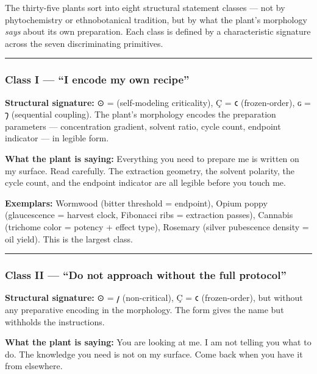 The thirty-five plants sort into eight structural statement classes ---
not by phytochemistry or ethnobotanical tradition, but by what the
plant's morphology \emph{says} about its own preparation. Each class is
defined by a characteristic signature across the seven discriminating
primitives.

\begin{center}\rule{0.5\linewidth}{0.5pt}\end{center}

\hypertarget{class-i-i-encode-my-own-recipe}{%
\subsubsection{Class I --- ``I encode my own
recipe''}\label{class-i-i-encode-my-own-recipe}}

\textbf{Structural signature:} ⊙ = \odot (self-modeling criticality), Ç
= 𐑤 (frozen-order), ɢ = 𐑠 (sequential coupling). The plant's morphology
encodes the preparation parameters --- concentration gradient, solvent
ratio, cycle count, endpoint indicator --- in legible form.

\textbf{What the plant is saying:} Everything you need to prepare me is
written on my surface. Read carefully. The extraction geometry, the
solvent polarity, the cycle count, and the endpoint indicator are all
legible before you touch me.

\textbf{Exemplars:} Wormwood (bitter threshold = endpoint), Opium poppy
(glaucescence = harvest clock, Fibonacci ribs = extraction passes),
Cannabis (trichome color = potency + effect type), Rosemary (silver
pubescence density = oil yield). This is the largest class.

\begin{center}\rule{0.5\linewidth}{0.5pt}\end{center}

\hypertarget{class-ii-do-not-approach-without-the-full-protocol}{%
\subsubsection{Class II --- ``Do not approach without the full
protocol''}\label{class-ii-do-not-approach-without-the-full-protocol}}

\textbf{Structural signature:} ⊙ = 𐑢 (non-critical), Ç = 𐑤
(frozen-order), but without any preparative encoding in the morphology.
The form gives the name but withholds the instructions.

\textbf{What the plant is saying:} You are looking at me. I am not
telling you what to do. The knowledge you need is not on my surface.
Come back when you have it from elsewhere.

